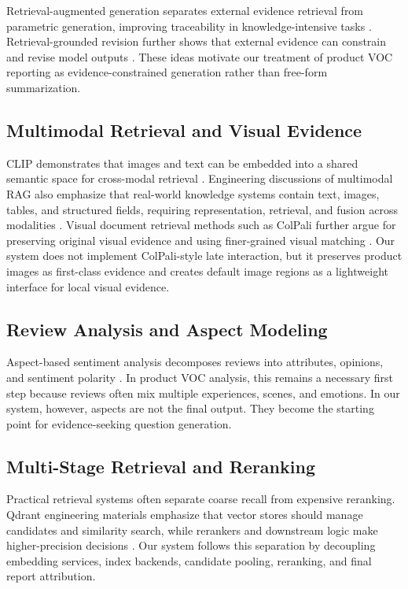 \documentclass[11pt]{article}
\begin{document}
Retrieval-augmented generation separates external evidence retrieval from parametric generation, improving traceability in knowledge-intensive tasks \citep{lewis2020retrievalAugmentedGeneration}. Retrieval-grounded revision further shows that external evidence can constrain and revise model outputs \citep{gao2023rarr}. These ideas motivate our treatment of product VOC reporting as evidence-constrained generation rather than free-form summarization.

\subsection{Multimodal Retrieval and Visual Evidence}

CLIP demonstrates that images and text can be embedded into a shared semantic space for cross-modal retrieval \citep{radford2021clip}. Engineering discussions of multimodal RAG also emphasize that real-world knowledge systems contain text, images, tables, and structured fields, requiring representation, retrieval, and fusion across modalities \citep{nvidia2024multimodalRagIntro,nvidia2024aiReadyKnowledgeSystems}. Visual document retrieval methods such as ColPali further argue for preserving original visual evidence and using finer-grained visual matching \citep{faysse2024colpali}. Our system does not implement ColPali-style late interaction, but it preserves product images as first-class evidence and creates default image regions as a lightweight interface for local visual evidence.

\subsection{Review Analysis and Aspect Modeling}

Aspect-based sentiment analysis decomposes reviews into attributes, opinions, and sentiment polarity \citep{pontiki2014semevalAspect}. In product VOC analysis, this remains a necessary first step because reviews often mix multiple experiences, scenes, and emotions. In our system, however, aspects are not the final output. They become the starting point for evidence-seeking question generation.

\subsection{Multi-Stage Retrieval and Reranking}

Practical retrieval systems often separate coarse recall from expensive reranking. Qdrant engineering materials emphasize that vector stores should manage candidates and similarity search, while rerankers and downstream logic make higher-precision decisions \citep{qdrant2024pdfRetrievalAtScale,qdrant2024multiVectorCourse}. Our system follows this separation by decoupling embedding services, index backends, candidate pooling, reranking, and final report attribution.
\end{document}
